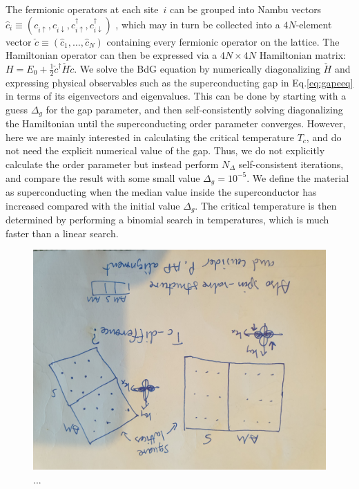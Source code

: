 \documentclass[aps,twocolumn,amsmath,amssymb,preprintnumbers,floatfix,prl,superscriptaddress,longbibliography]{revtex4-2}%
\newcommand{\dn}{\downarrow}
\newcommand{\up}{\uparrow}
\newcommand{\ph}{\phantom{\dag}}
\newcommand{\eq}{Eq.}%
\begin{document}
The fermionic operators at each site~$i$ can be grouped into Nambu vectors 
$\hat{c}_i \equiv (c_{i \up}^{\ph}, 
c_{i\dn}^{\ph}, c_{i\up}^\dag, c_{i\dn}^\dag)$
, which may in turn be collected into a $4N$-element vector $\check{c} \equiv (\hat{c}_1, \ldots, \hat{c}_N)$ containing every fermionic operator on the lattice.
The Hamiltonian operator can then be expressed via a $4N\times4N$ Hamiltonian matrix: $H = E_0 + \frac{1}{2} \check{c}^\dag \check{H} \check{c}$.
We solve the BdG equation by numerically diagonalizing $\check H$ and expressing physical observables such as the superconducting gap in \eq \eqref{eq:gapeeq} in terms of its eigenvectors and eigenvalues. 
This can be done by starting with a guess $\Delta_g$ for the gap parameter, and then self-consistently solving diagonalizing the Hamiltonian until the superconducting order parameter converges. However, here we are mainly interested in calculating the critical temperature $T_c$, and do not need the explicit numerical value of the gap. 
Thus, we do not explicitly calculate the order parameter but instead perform $N_\Delta$ self-consistent iterations, and compare the result with some small value $\Delta_g = 10^{-5}$. We define the material as superconducting when the median value inside the superconductor has increased compared with the initial value $\Delta_g$.
The critical temperature is then determined by performing a binomial search in temperatures, which is much faster than a linear search.

\begin{figure}[t!]
\includegraphics[width=0.87\columnwidth]{test.jpg}
	\caption{...
	}
	\label{fig:model}
\end{figure}
\text{ }\\
\text{ }\\
\end{document}
